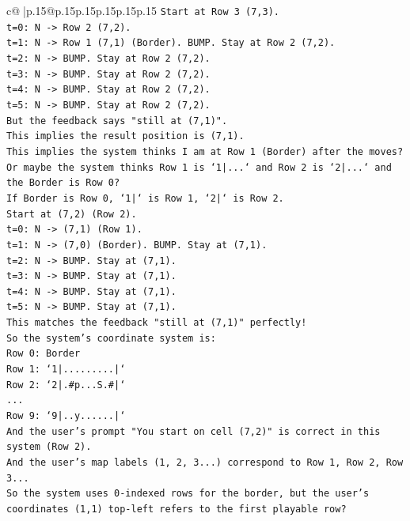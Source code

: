 \documentclass{article}
\begin{document}
{\begin{supertabular}{c@{$\;$}|p{.15\linewidth}@{}p{.15\linewidth}p{.15\linewidth}p{.15\linewidth}p{.15\linewidth}p{.15\linewidth}}
{{{\texttt{Start at Row 3 (7,3).} \\
\texttt{t=0: N {-}> Row 2 (7,2).} \\
\texttt{t=1: N {-}> Row 1 (7,1) (Border). BUMP. Stay at Row 2 (7,2).} \\
\texttt{t=2: N {-}> BUMP. Stay at Row 2 (7,2).} \\
\texttt{t=3: N {-}> BUMP. Stay at Row 2 (7,2).} \\
\texttt{t=4: N {-}> BUMP. Stay at Row 2 (7,2).} \\
\texttt{t=5: N {-}> BUMP. Stay at Row 2 (7,2).} \\
\texttt{But the feedback says "still at (7,1)".} \\
\texttt{This implies the result position is (7,1).} \\
\texttt{This implies the system thinks I am at Row 1 (Border) after the moves?} \\
\texttt{Or maybe the system thinks Row 1 is `1|...` and Row 2 is `2|...` and the Border is Row 0?} \\
\texttt{If Border is Row 0, `1|` is Row 1, `2|` is Row 2.} \\
\texttt{Start at (7,2) (Row 2).} \\
\texttt{t=0: N {-}> (7,1) (Row 1).} \\
\texttt{t=1: N {-}> (7,0) (Border). BUMP. Stay at (7,1).} \\
\texttt{t=2: N {-}> BUMP. Stay at (7,1).} \\
\texttt{t=3: N {-}> BUMP. Stay at (7,1).} \\
\texttt{t=4: N {-}> BUMP. Stay at (7,1).} \\
\texttt{t=5: N {-}> BUMP. Stay at (7,1).} \\
\texttt{This matches the feedback "still at (7,1)" perfectly!} \\
\texttt{So the system's coordinate system is:} \\
\texttt{Row 0: Border} \\
\texttt{Row 1: `1|.........|`} \\
\texttt{Row 2: `2|.\#p...S.\#|`} \\
\texttt{...} \\
\texttt{Row 9: `9|..y......|`} \\
\texttt{And the user's prompt "You start on cell (7,2)" is correct in this system (Row 2).} \\
\texttt{And the user's map labels (1, 2, 3...) correspond to Row 1, Row 2, Row 3...} \\
\texttt{So the system uses 0{-}indexed rows for the border, but the user's coordinates (1,1) top{-}left refers to the first playable row?} \\
}}}
\end{supertabular}}
\end{document}
